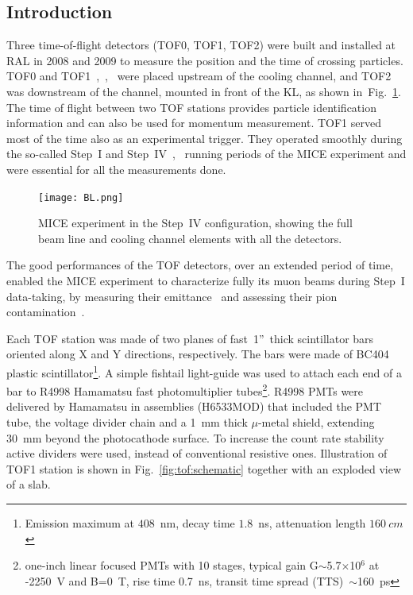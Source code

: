 
\subsection{Introduction}
\label{SubSect:TOF_Intro}

Three time-of-flight detectors (TOF0, TOF1, TOF2) were built and
installed at RAL in 2008 and 2009 to measure the position and the time
of crossing particles.  TOF0 and
TOF1~\cite{NOTE145},~\cite{NOTE241},~\cite{2010NIMPA.615...14B} were
placed upstream of the cooling channel, and TOF2~\cite{NOTE286} was
downstream of the channel, mounted in front of the KL, as shown
in~Fig.~\ref{fig:BL}.  The time of flight between two TOF stations
provides particle identification information and can also be used for
momentum measurement. TOF1 served most of the time also as an
experimental trigger. They operated smoothly during the so-called
Step~I and Step~IV~\cite{Rajaram:2015bra},~\cite{2015ehep.confE.521B}
running periods of the MICE experiment and were essential for all the
measurements done.

\begin{figure}[!ht]
  \begin{center}
    \texttt{[image: BL.png]}
    \caption{MICE experiment in the Step~IV configuration, showing the full beam line and cooling channel elements with all the detectors.}
    \label{fig:BL}
  \end{center}
\end{figure}

The good performances of the TOF detectors, over an extended period of time,
enabled the MICE experiment to characterize fully its muon beams during
Step~I data-taking, by measuring their emittance~\cite{2013arXiv1306.1509T} and
assessing their pion contamination~\cite{2016JInst..11P3001A}.

Each TOF station was made of two planes of fast~1''~thick scintillator
bars oriented along X and Y directions, respectively. The bars were
made of BC404 plastic scintillator\footnote{Emission maximum at
  $408$~nm, decay time $1.8$~ns, attenuation length $160~cm$}. A
simple fishtail light-guide was used to attach each end of a bar to
R4998 Hamamatsu fast photomultiplier tubes\footnote{one-inch linear
  focused PMTs with 10 stages, typical gain G$\sim$5.7$\times$10$^6$
  at -2250~V and B=0~T, rise time 0.7~ns, transit time spread
  (TTS)~$\sim$160~ps}.  R4998 PMTs were delivered by Hamamatsu in
assemblies (H6533MOD) that included the PMT tube, the voltage divider
chain and a 1~mm thick $\mu$-metal shield, extending 30~mm beyond the
photocathode surface.  To increase the count rate stability active
dividers were used, instead of conventional resistive
ones. Illustration of TOF1 station is shown in
Fig.~\ref{fig:tof:schematic} together with an exploded view of a
slab.

